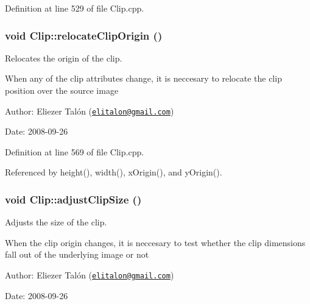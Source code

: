 Definition at line 529 of file Clip.cpp.\hypertarget{class_clip_66fc93c15de96d077d2242a53576528e}{
\subsubsection[relocateClipOrigin]{\setlength{\rightskip}{0pt plus 5cm}void Clip::relocateClipOrigin ()}}
\label{class_clip_66fc93c15de96d077d2242a53576528e}


Relocates the origin of the clip. 

When any of the clip attributes change, it is neccesary to relocate the clip position over the source image

\begin{Desc}
\item[Author:]Eliezer Talón (\href{mailto:elitalon@gmail.com}{\tt elitalon@gmail.com}) \end{Desc}
\begin{Desc}
\item[Date:]2008-09-26 \end{Desc}


Definition at line 569 of file Clip.cpp.

Referenced by height(), width(), xOrigin(), and yOrigin().\hypertarget{class_clip_e050cf90340e9160f79688627d69a00b}{
\subsubsection[adjustClipSize]{\setlength{\rightskip}{0pt plus 5cm}void Clip::adjustClipSize ()}}
\label{class_clip_e050cf90340e9160f79688627d69a00b}


Adjusts the size of the clip. 

When the clip origin changes, it is neccesary to test whether the clip dimensions fall out of the underlying image or not

\begin{Desc}
\item[Author:]Eliezer Talón (\href{mailto:elitalon@gmail.com}{\tt elitalon@gmail.com}) \end{Desc}
\begin{Desc}
\item[Date:]2008-09-26 \end{Desc}


